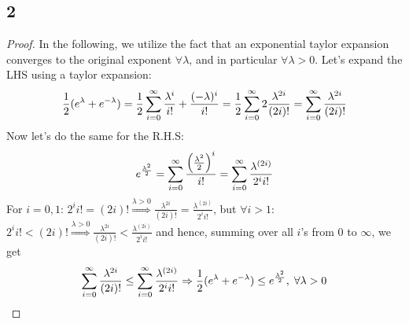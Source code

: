 \subsection*{2}
\begin{proof}
    In the following, we utilize the fact that an exponential taylor expansion converges to the original exponent $\forall \lambda$, and in particular $\forall \lambda>0$.
    Let's expand the LHS using a taylor expansion:
    \begin{equation*}
        \frac{1}{2} (e^\lambda + e^{-\lambda}) = \frac{1}{2} \sum_{i=0}^{\infty} \frac{\lambda^i}{i!} + \frac{(-\lambda)^i}{i!} 
        = \frac{1}{2} \sum_{i=0}^{\infty} 2\frac{\lambda^{2i}}{(2i)!} = \sum_{i=0}^{\infty} \frac{\lambda^{2i}}{(2i)!}
    \end{equation*}
    Now let's do the same for the R.H.S:
    \begin{equation*}
        e^{\frac{\lambda^2}{2}} = \sum_{i=0}^{\infty} \frac{\left(\frac{\lambda^2}{2}\right)^i}{i!} = 
        \sum_{i=0}^{\infty} \frac{\lambda^{(2i)}}{2^i i!}
    \end{equation*}
    For $i=0, 1$: $2^i i! = (2i)! \overset{\lambda > 0}{\Rightarrow}\frac{\lambda^{2i}}{(2i)!} = \frac{\lambda^{(2i)}}{2^i i!}$, but $\forall i>1$: $2^i i! < (2i)! \overset{\lambda > 0}{\Rightarrow} \frac{\lambda^{2i}}{(2i)!} < \frac{\lambda^{(2i)}}{2^i i!}$ 
    and hence, summing over all $i$'s from 0 to $\infty$, we get 
    \begin{equation*}
        \sum_{i=0}^{\infty} \frac{\lambda^{2i}}{(2i)!} \leq \sum_{i=0}^{\infty} \frac{\lambda^{(2i)}}{2^i i!} \Rightarrow
        \frac{1}{2} (e^\lambda + e^{-\lambda}) \leq e^{\frac{\lambda^2}{2}}, \; \forall \lambda > 0
    \end{equation*}
\end{proof}

